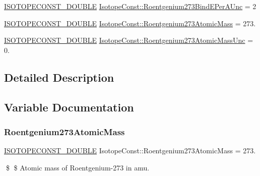 \begin{DoxyCompactItemize}
\item 
\mbox{\hyperlink{group___isotope_const-_macros_ga8f45a7272ce02c0b4c65c44636ed719a}{I\+S\+O\+T\+O\+P\+E\+C\+O\+N\+S\+T\+\_\+\+D\+O\+U\+B\+LE}} \mbox{\hyperlink{group___isotope_const-_roentgenium-_rg273_ga1bff3b1143d139df70bf273a6ed52ea9}{Isotope\+Const\+::\+Roentgenium273\+Bind\+E\+Per\+A\+Unc}} = 2
\item 
\mbox{\hyperlink{group___isotope_const-_macros_ga8f45a7272ce02c0b4c65c44636ed719a}{I\+S\+O\+T\+O\+P\+E\+C\+O\+N\+S\+T\+\_\+\+D\+O\+U\+B\+LE}} \mbox{\hyperlink{group___isotope_const-_roentgenium-_rg273_ga579689c89380415d6bd83d219ff9e6cc}{Isotope\+Const\+::\+Roentgenium273\+Atomic\+Mass}} = 273.
\item 
\mbox{\hyperlink{group___isotope_const-_macros_ga8f45a7272ce02c0b4c65c44636ed719a}{I\+S\+O\+T\+O\+P\+E\+C\+O\+N\+S\+T\+\_\+\+D\+O\+U\+B\+LE}} \mbox{\hyperlink{group___isotope_const-_roentgenium-_rg273_gae848b383e23de6c42542aa7e4b297071}{Isotope\+Const\+::\+Roentgenium273\+Atomic\+Mass\+Unc}} = 0.
\end{DoxyCompactItemize}


\subsection{Detailed Description}


\subsection{Variable Documentation}
\mbox{\label{group___isotope_const-_roentgenium-_rg273_ga579689c89380415d6bd83d219ff9e6cc}} 
\subsubsection{\texorpdfstring{Roentgenium273\+Atomic\+Mass}{Roentgenium273AtomicMass}}
{\footnotesize\ttfamily \mbox{\hyperlink{group___isotope_const-_macros_ga8f45a7272ce02c0b4c65c44636ed719a}{I\+S\+O\+T\+O\+P\+E\+C\+O\+N\+S\+T\+\_\+\+D\+O\+U\+B\+LE}} Isotope\+Const\+::\+Roentgenium273\+Atomic\+Mass = 273.}

\$ \$ Atomic mass of Roentgenium-\/273 in amu. \mbox{\label{group___isotope_const-_roentgenium-_rg273_gae848b383e23de6c42542aa7e4b297071}} 
